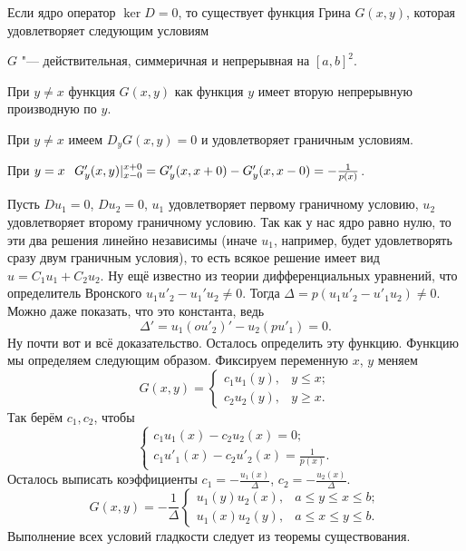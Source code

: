 \begin{Lem}
  Если ядро оператор $\ker D=0$, то существует функция Грина $G(x,y)$, которая удовлетворяет следующим условиям
\begin{azItems}
  \item $G$ "--- действительная, симмеричная и непрерывная на $[a,b]^2$.
  \item При $y\ne x$ функция $G(x,y)$ как функция $y$ имеет вторую непрерывную производную по $y$.
  \item При $y\ne x$ имеем $D_y G(x,y) = 0$ и удовлетворяет граничным условиям.
  \item При $y=x\hskip .75em plus.1em minus.08em\relax G'_y(x,y)|_{x-0}^{x+0} = G'_y(x,x+0) - G'_y(x,x-0) = -\frac1{p(x)}$.
\end{azItems}
\end{Lem}
\begin{Proof}
  Пусть $D u_1 = 0$, $Du_2 = 0$, $u_1$ удовлетворяет первому граничному условию, $u_2$ удовлетворяет второму граничному условию. Так как у нас ядро равно нулю, то эти два решения линейно независимы (иначе $u_1$, например, будет удовлетворять сразу двум граничным условия), то есть всякое решение имеет вид $u = C_1 u_1 + C_2 u_2$. Ну ещё известно из теории дифференциальных уравнений, что определитель Вронского $u_1 u'_2 - u_1' u_2\ne 0$. Тогда $\Delta = p (u_1  u'_2 - u'_1 u_2)\ne 0$. Можно даже показать, что это константа, ведь
\[
  \Delta' = u_1(o u'_2)' - u_2 (p u'_1) = 0.
\]
Ну почти вот и всё доказательство. Осталось определить эту функцию. Функцию мы определяем следующим образом. Фиксируем переменную $x$, $y$ меняем
\[
  G(x,y) = \begin{cases}
  c_1 u_1(y),& y\le x;\\
  c_2 u_2(y), & y\ge x.
\end{cases}
\]
Так берём $c_1,c_2$, чтобы
\[
  \begin{cases}
    c_1 u_1(x) - c_2u_2(x) = 0;\\
    c_1 u'_1(x) -c_2 u'_2(x) = \frac1{p(x)}.
\end{cases}
\]
Осталось выписать коэффициенты $c_1 = -\frac{u_1(x)}\Delta$, $c_2 = -\frac{u_2(x)}\Delta$.
\[
  G(x,y) = -\frac1\Delta\begin{cases}
  u_1(y) u_2(x),& a\le y\le x\le b;\\
  u_1(x) u_2(y),& a\le x\le y\le b.
\end{cases}
\]
Выполнение всех условий гладкости следует из теоремы существования.
\end{Proof}

